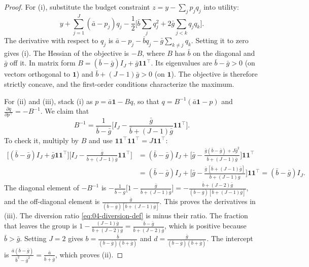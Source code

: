 \begin{proof}
For (i), substitute the budget constraint $z = y - \sum_j p_jq_j$ into utility:
\begin{equation*}
y + \sum_{j=1}^J(\bar a - p_j)q_j - \frac{1}{2}\Big[\bar b\sum_{j}q_j^2 + 2\bar g\sum_{j<k}q_jq_k\Big].
\end{equation*}
The derivative with respect to $q_j$ is $\bar a - p_j - \bar bq_j - \bar g\sum_{k\ne j}q_k$. Setting it to zero gives
(i). The Hessian of the objective is $-B$, where $B$ has $\bar b$ on the diagonal and $\bar g$ off it. In matrix form
$B = (\bar b - \bar g)I_J + \bar g\mathbf{1}\mathbf{1}^\top$. Its eigenvalues are $\bar b - \bar g > 0$ (on vectors
orthogonal to $\mathbf{1}$) and $\bar b + (J-1)\bar g > 0$ (on $\mathbf{1}$). The objective is therefore strictly
concave, and the first-order conditions characterize the maximum.

For (ii) and (iii), stack (i) as $p = \bar a\mathbf{1} - Bq$, so that $q = B^{-1}(\bar a\mathbf{1} - p)$ and
$\frac{\partial q}{\partial p^\top} = -B^{-1}$. We claim that
\begin{equation*}
B^{-1} = \frac{1}{\bar b - \bar g}\Big[I_J - \frac{\bar g}{\bar b + (J-1)\bar g}\mathbf{1}\mathbf{1}^\top\Big].
\end{equation*}
To check it, multiply by $B$ and use $\mathbf{1}\mathbf{1}^\top\mathbf{1}\mathbf{1}^\top = J\mathbf{1}\mathbf{1}^\top$:
\begin{align*}
\big[(\bar b - \bar g)I_J + \bar g\mathbf{1}\mathbf{1}^\top\big]\Big[I_J - \frac{\bar g}{\bar b + (J-1)\bar g}\mathbf{1}\mathbf{1}^\top\Big]
&= (\bar b - \bar g)I_J + \Big[\bar g - \frac{\bar g(\bar b - \bar g) + J\bar g^2}{\bar b + (J-1)\bar g}\Big]\mathbf{1}\mathbf{1}^\top \\
&= (\bar b - \bar g)I_J + \Big[\bar g - \frac{\bar g\,[\bar b + (J-1)\bar g]}{\bar b + (J-1)\bar g}\Big]\mathbf{1}\mathbf{1}^\top
= (\bar b - \bar g)I_J .
\end{align*}
The diagonal element of $-B^{-1}$ is
$-\frac{1}{\bar b - \bar g}\big[1 - \frac{\bar g}{\bar b + (J-1)\bar g}\big] = -\frac{\bar b + (J-2)\bar g}{(\bar b - \bar g)[\bar b + (J-1)\bar g]}$,
and the off-diagonal element is $\frac{\bar g}{(\bar b - \bar g)[\bar b + (J-1)\bar g]}$. This proves the derivatives in
(iii). The diversion ratio \eqref{eq:04-diversion-def} is minus their ratio. The fraction that leaves the group is
$1 - \frac{(J-1)\bar g}{\bar b + (J-2)\bar g} = \frac{\bar b - \bar g}{\bar b + (J-2)\bar g}$, which is positive
because $\bar b > \bar g$. Setting $J = 2$ gives $b = \frac{\bar b}{(\bar b - \bar g)(\bar b + \bar g)}$ and
$d = \frac{\bar g}{(\bar b - \bar g)(\bar b + \bar g)}$. The intercept is
$\frac{\bar a(\bar b - \bar g)}{\bar b^2 - \bar g^2} = \frac{\bar a}{\bar b + \bar g}$, which proves (ii).
\end{proof}

